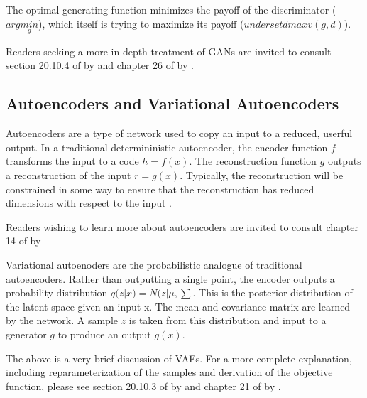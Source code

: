 \documentclass{article}
\begin{document}
The optimal generating function minimizes the payoff of the discriminator (\( arg\underset{g}{min}\)), which itself is trying to maximize its payoff (\(underset{d}{max}v(g,d)\)).

Readers seeking a more in-depth treatment of GANs are invited to consult section 20.10.4 of  by \citeauthor{Goodfellow-et-al-2016} and chapter 26 of  by \citeauthor{pml2Book}.

\subsection{Autoencoders and Variational Autoencoders}

Autoencoders are a type of network used to copy an input to a reduced, userful output. In a traditional determininistic autoencoder, the encoder function \(f\) transforms the input to a code \(h = f(x)\). The reconstruction function \(g\) outputs a reconstruction of the input \(r = g(x)\). Typically, the reconstruction will be constrained in some way to ensure that the reconstruction has reduced dimensions with respect to the input \cite{Goodfellow-et-al-2016}.

Readers wishing to learn more about autoencoders are invited to consult chapter 14 of  by 

Variational autoenoders are the probabilistic analogue of traditional autoencoders. Rather than outputting a single point, the encoder outputs a probability distribution \(q(z|x) = N(z|\mu , \sum\). This is the posterior distribution of the latent space given an input x. The mean and covariance matrix are learned by the network. A sample \(z\) is taken from this distribution and input to a generator \(g\) to produce an output \(g(x)\).

The above is a very brief discussion of VAEs. For a more complete explanation, including reparameterization of the samples and derivation of the objective function, please see section 20.10.3 of  by \citeauthor{Goodfellow-et-al-2016} and chapter 21 of  by \citeauthor{pml2Book}.
\newpage


\printbibliography
\end{document}
